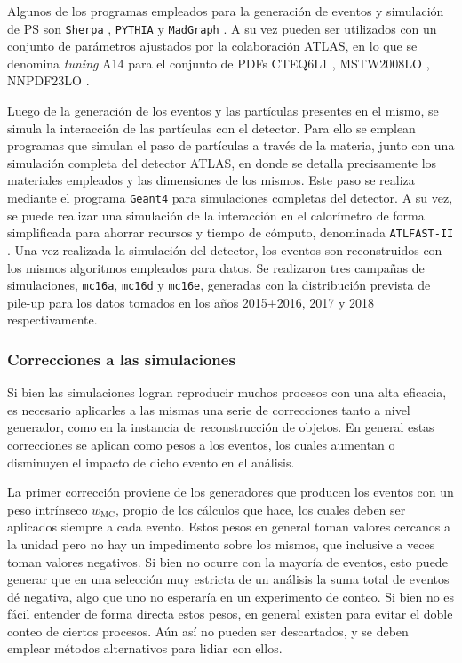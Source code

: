 Algunos de los programas empleados para la generación de eventos y simulación de PS son \texttt{Sherpa} \cite{SherpaGen, Schumann:2007mg, Bothmann:2019yzt}, \texttt{PYTHIA} \cite{Sjostrand:2014zea} y \texttt{MadGraph} \cite{Alwall:2014hca}. A su vez pueden ser utilizados con un conjunto de parámetros ajustados por la colaboración ATLAS, en lo que se denomina \textit{tuning} A14 \cite{ATL-PHYS-PUB-2014-021} para el conjunto de PDFs CTEQ6L1 \cite{Pumplin:2002vw}, MSTW2008LO \cite{Martin:2009iq, Martin:2009bu, Martin_2010}, NNPDF23LO \cite{Ball:2012cx,Ball:2014uwa}. 


Luego de la generación de los eventos y las partículas presentes en el mismo, se simula la interacción de las partículas con el detector. 
Para ello se emplean programas que simulan el paso de partículas a través de la materia, junto con una simulación completa del detector ATLAS, en donde se detalla precisamente los materiales empleados y las dimensiones de los mismos. Este paso se realiza mediante el programa \texttt{Geant4} \cite{Geant4} para simulaciones completas del detector. A su vez, se puede realizar una simulación de la interacción en el calorímetro de forma simplificada para ahorrar recursos y tiempo de cómputo, denominada \texttt{ATLFAST-II} \cite{Richter-Was:683751,Lukas_2012}. Una vez realizada la simulación del detector, los eventos son reconstruidos con los mismos algoritmos empleados para datos. Se realizaron tres campañas de simulaciones, \texttt{mc16a}, \texttt{mc16d} y \texttt{mc16e}, generadas con la distribución prevista de pile-up para los datos tomados en los años 2015+2016, 2017 y 2018 respectivamente.






\subsubsection{Correcciones a las simulaciones}\label{sec:mc_weights}

Si bien las simulaciones logran reproducir muchos procesos con una alta eficacia, es necesario aplicarles a las mismas una serie de correcciones tanto a nivel generador, como en la instancia de reconstrucción de objetos. En general estas correcciones se aplican como pesos a los eventos, los cuales aumentan o disminuyen el impacto de dicho evento en el análisis.

La primer corrección proviene de los generadores que producen los eventos con un peso intrínseco $w_\text{MC}$, propio de los cálculos que hace, los cuales deben ser aplicados siempre a cada evento. Estos pesos en general toman valores cercanos a la unidad pero no hay un impedimento sobre los mismos, que inclusive a veces toman valores negativos. Si bien no ocurre con la mayoría de eventos, esto puede generar que en una selección muy estricta de un análisis la suma total de eventos dé negativa, algo que uno no esperaría en un experimento de conteo. Si bien no es fácil entender de forma directa estos pesos, en general existen para evitar el doble conteo de ciertos procesos. Aún así no pueden ser descartados, y se deben emplear métodos alternativos para lidiar con ellos.

